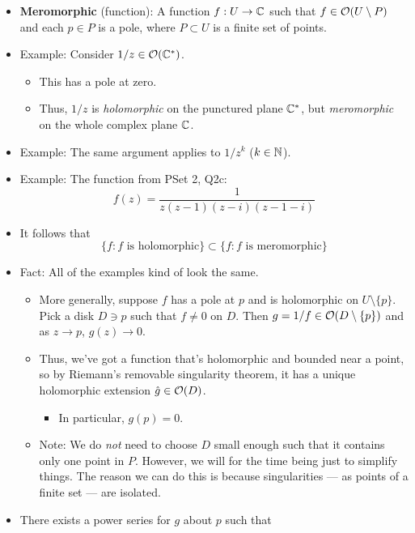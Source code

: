 \documentclass[../notes.tex]{subfiles}
\begin{document}
\begin{itemize}
\begin{itemize}
    \end{itemize}
    \item \textbf{Meromorphic} (function): A function $f:U\to\mathbb{C}$ such that $f\in\mathcal{O}(U\setminus P)$ and each $p\in P$ is a pole, where $P\subset U$ is a finite set of points.
    \item Example: Consider $1/z\in\mathcal{O}(\mathbb{C}^*)$.
    \begin{itemize}
        \item This has a pole at zero.
        \item Thus, $1/z$ is \emph{holomorphic} on the punctured plane $\mathbb{C}^*$, but \emph{meromorphic} on the whole complex plane $\mathbb{C}$.
    \end{itemize}
    \item Example: The same argument applies to $1/z^k$ ($k\in\mathbb{N}$).
    \item Example: The function from PSet 2, Q2c:
    \begin{equation*}
        f(z) = \frac{1}{z(z-1)(z-i)(z-1-i)}
    \end{equation*}
    \item It follows that
    \begin{equation*}
        \{f:f\text{ is holomorphic}\} \subset \{f:f\text{ is meromorphic}\}
    \end{equation*}
    \item Fact: All of the examples kind of look the same.
    \begin{itemize}
        \item More generally, suppose $f$ has a pole at $p$ and is holomorphic on $U\setminus\{p\}$. Pick a disk $D\ni p$ such that $f\neq 0$ on $D$. Then $g=1/f\in\mathcal{O}(D\setminus\{p\})$ and as $z\to p$, $g(z)\to 0$.
        \item Thus, we've got a function that's holomorphic and bounded near a point, so by Riemann's removable singularity theorem, it has a unique holomorphic extension $\hat{g}\in\mathcal{O}(D)$.
        \begin{itemize}
            \item In particular, $g(p)=0$.
        \end{itemize}
        \item Note: We do \emph{not} need to choose $D$ small enough such that it contains only one point in $P$. However, we will for the time being just to simplify things. The reason we can do this is because singularities --- as points of a finite set --- are isolated.
    \end{itemize}
    \item There exists a power series for $g$ about $p$ such that

\end{itemize}
\end{document}
